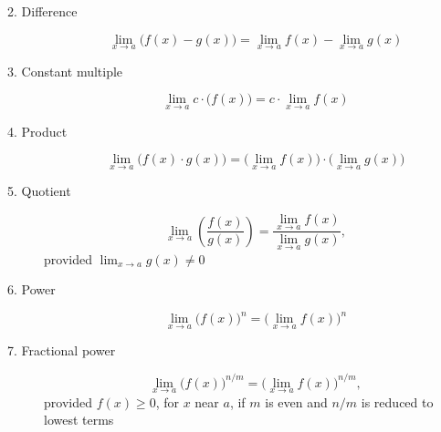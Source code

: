 \documentclass[nooutcomes]{ximera}
\begin{document}
\begin{problem}
\begin{description}
      \item[2. Difference]
        \[
          \lim_{x \to a} \bigl(f(x) - g(x)\bigr) = \lim_{x \to a} f(x) - \lim_{x \to a} g(x)
        \]

      \item[3. Constant multiple]
        \[
          \lim_{x \to a} c \cdot \bigl( f(x) \bigr) = c \cdot \lim_{x \to a} f(x)
        \]

      \item[4. Product]
        \[
          \lim_{x \to a} \bigl(f(x) \cdot g(x)\bigr) = \bigl(\lim_{x \to a} f(x)\bigr) \cdot \bigl(\lim_{x \to a} g(x) \bigr)
        \]

      \item[5. Quotient]
        \[
          \lim_{x \to a} \left(\frac{f(x)}{g(x)}\right) = \frac{\lim_{x \to a} f(x)}{\lim_{x \to a} g(x)},
        \]
        provided $\lim_{x \to a} g(x) \ne 0$

      \item[6. Power]
        \[
          \lim_{x \to a} \bigl(f(x)\bigr)^n = \bigl(\lim_{x \to a} f(x)\bigr)^n
        \]

      \item[7. Fractional power]
        \[
          \lim_{x \to a} \bigl(f(x)\bigr)^{n/m} = \bigl(\lim_{x \to a} f(x)\bigr)^{n/m},
        \]
        provided $f(x) \ge 0$, for $x$ near $a$, if $m$ is even and $n/m$ is reduced to lowest terms
    \end{description}
\end{problem}
\end{document}
